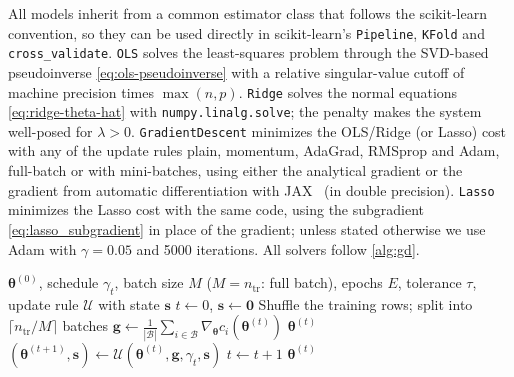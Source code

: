 All models inherit from a common estimator class that follows the scikit-learn
convention, so they can be used directly in scikit-learn's
\texttt{Pipeline}, \texttt{KFold} and \texttt{cross\_validate}. \texttt{OLS}
solves the least-squares problem through the SVD-based pseudoinverse
\cref{eq:ols-pseudoinverse} with a relative singular-value cutoff of machine
precision times $\max(n,p)$. \texttt{Ridge} solves the normal equations
\cref{eq:ridge-theta-hat} with \texttt{numpy.linalg.solve}; the penalty makes the
system well-posed for $\lambda>0$. \texttt{GradientDescent} minimizes the
OLS/Ridge (or Lasso) cost with any of the update rules plain, momentum,
AdaGrad, RMSprop and Adam, full-batch or with mini-batches, using either the
analytical gradient or the gradient from automatic differentiation with
JAX~\cite{bradbury_2018} (in double precision).
\texttt{Lasso} minimizes the Lasso cost with the same code, using the
subgradient \cref{eq:lasso_subgradient} in place of the gradient; unless stated
otherwise we use Adam with $\gamma = 0.05$ and 5000 iterations. All solvers
follow \cref{alg:gd}.

\begin{algorithm}
    \caption{Gradient descent with a generic update rule}
    \label{alg:gd}
    {\small
    \begin{algorithmic}[1]
        \Require $\bm{\theta}^{(0)}$, schedule $\gamma_t$, batch size $M$
        ($M = n_\text{tr}$: full batch), epochs $E$, tolerance $\tau$,
        update rule $\mathcal{U}$ with state $\bm{s}$
        \State $t \gets 0$, $\bm{s} \gets \bm{0}$
            \State Shuffle the training rows; split into $\lceil n_\text{tr}/M\rceil$ batches
                \State $\bm{g} \gets \frac{1}{|\mathcal{B}|}\sum_{i\in\mathcal{B}}
                \nabla_{\bm{\theta}} c_i(\bm{\theta}^{(t)})$ 
                    \State \Return $\bm{\theta}^{(t)}$
                \EndIf
                \State $(\bm{\theta}^{(t+1)}, \bm{s}) \gets
                \mathcal{U}(\bm{\theta}^{(t)}, \bm{g}, \gamma_t, \bm{s})$
                \State $t \gets t + 1$
            \EndFor
        \EndFor
        \State \Return $\bm{\theta}^{(t)}$
    \end{algorithmic}
    }
\end{algorithm}

